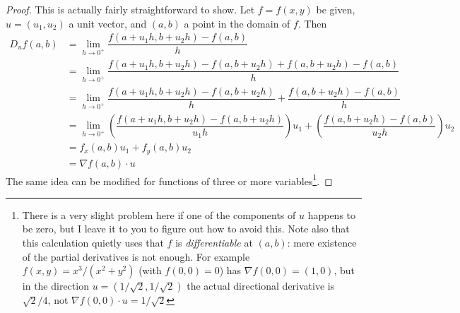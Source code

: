 \documentclass[12pt]{article}
\numberwithin{equation}{subsection}
\numberwithin{figure}{subsection}
\theoremstyle{note}
\begin{document}
{\begin{proof}
This is actually fairly straightforward to show. Let $f=f(x,y)$ be given, $u=(u_1,u_2)$ a unit vector, and $(a,b)$ a point in the domain of $f$. Then \begin{align*} D_u f(a,b)&=\lim_{h\to0^+} \dfrac{f(a+u_1 h, b+u_2 h)- f(a,b)}{h} \\ 
&= \lim_{h\to 0^+} \dfrac{ f(a+u_1 h, b+u_2 h)- f(a, b+u_2 h) + f(a,b+u_2 h) - f(a,b)}{h} \\
&=\lim_{h\to 0^+} \dfrac{ f(a+u_1 h, b+u_2 h)- f(a, b+u_2 h)}{h} +  \dfrac{ f(a, b+u_2 h)- f(a, b)}{h} \\
&=\lim_{h\to 0^+} \left( \dfrac{ f(a+u_1 h, b+u_2 h)- f(a, b+u_2 h)}{u_1 h}\right) u_1 +  \left( \dfrac{ f(a, b+u_2 h)- f(a, b)}{u_2 h}\right) u_2 \\
&=f_x(a,b) u_1+f_y(a,b) u_2 \\
&= \nabla f (a,b) \cdot u\end{align*} 
The same idea can be modified for functions of three or more variables\footnote{There is a very slight problem here if one of the components of $u$ happens to be zero, but I leave it to you to figure out how to avoid this. Note also that this calculation quietly uses that $f$ is \textit{differentiable} at $(a,b)$: mere existence of the partial derivatives is not enough. For example $f(x,y)=x^3/(x^2+y^2)$ (with $f(0,0)=0$) has $\nabla f(0,0)=(1,0)$, but in the direction $u=(1/\sqrt2,1/\sqrt2)$ the actual directional derivative is $\sqrt2/4$, not $\nabla f(0,0)\cdot u=1/\sqrt{2}$}.
\end{proof}



}
\end{document}

